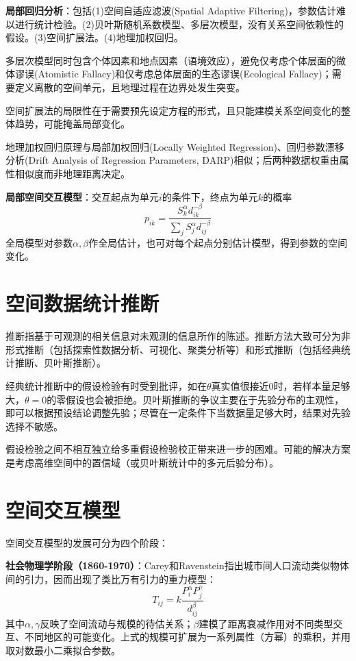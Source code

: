 \par \textbf{局部回归分析}：包括(1)空间自适应滤波(Spatial Adaptive Filtering)，参数估计难以进行统计检验。(2)贝叶斯随机系数模型、多层次模型，没有关系空间依赖性的假设。(3)空间扩展法。(4)地理加权回归。

\par 多层次模型同时包含个体因素和地点因素（语境效应），避免仅考虑个体层面的微体谬误(Atomistic Fallacy)和仅考虑总体层面的生态谬误(Ecological Fallacy)；需要定义离散的空间单元，且地理过程在边界处发生突变。

\par 空间扩展法的局限性在于需要预先设定方程的形式，且只能建模关系空间变化的整体趋势，可能掩盖局部变化。

\par 地理加权回归原理与局部加权回归(Locally Weighted Regression)、回归参数漂移分析(Drift Analysis of Regression Parameters, DARP)相似；后两种数据权重由属性相似度而非地理距离决定。

\par \textbf{局部空间交互模型}：交互起点为单元$i$的条件下，终点为单元$k$的概率
\begin{equation}
    p_{ik}=\frac{S_k^\alpha d_{ik}^{-\beta}}{\sum_j S_j^\alpha d_{ij}^{-\beta}}
\end{equation}
全局模型对参数$\alpha,\beta$作全局估计，也可对每个起点分别估计模型，得到参数的空间变化。

\section{空间数据统计推断}

\par 推断指基于可观测的相关信息对未观测的信息所作的陈述。推断方法大致可分为非形式推断（包括探索性数据分析、可视化、聚类分析等）和形式推断（包括经典统计推断、贝叶斯推断）。

\par 经典统计推断中的假设检验有时受到批评，如在$\theta$真实值很接近0时，若样本量足够大，$\theta=0$的零假设也会被拒绝。贝叶斯推断的争议主要在于先验分布的主观性，即可以根据预设结论调整先验；尽管在一定条件下当数据量足够大时，结果对先验选择不敏感。

\par 假设检验之间不相互独立给多重假设检验校正带来进一步的困难。可能的解决方案是考虑高维空间中的置信域（或贝叶斯统计中的多元后验分布）。

\section{空间交互模型}
\par 空间交互模型的发展可分为四个阶段：
\par \textbf{社会物理学阶段（1860-1970）}：Carey和Ravenstein指出城市间人口流动类似物体间的引力，因而出现了类比万有引力的重力模型：
\begin{equation}
    T_{ij}=k\frac{P_i^\alpha P_j^\gamma}{d_{ij}^\beta}
\end{equation}
其中$\alpha,\gamma$反映了空间流动与规模的待估关系；$\beta$建模了距离衰减作用对不同类型交互、不同地区的可能变化。上式的规模可扩展为一系列属性（方幂）的乘积，并用取对数最小二乘拟合参数。

